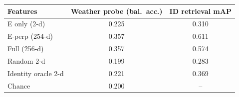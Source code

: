 \begin{tabular}{lcc}
\toprule
Features & Weather probe (bal.\ acc.) & ID retrieval mAP \\
\midrule
E only (2-d) & 0.225 & 0.310 \\
E-perp (254-d) & 0.357 & 0.611 \\
Full (256-d) & 0.357 & 0.574 \\
Random 2-d & 0.199 & 0.283 \\
Identity oracle 2-d & 0.221 & 0.369 \\
\midrule
Chance & 0.200 & -- \\
\bottomrule
\end{tabular}
